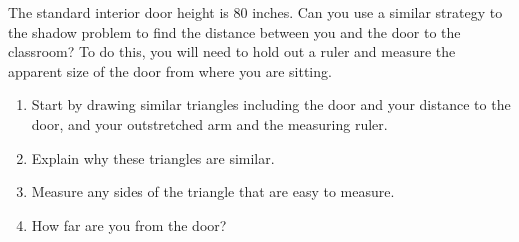\documentclass[nooutcomes,noauthor]{ximera}
\begin{document}
\begin{problem}
The standard interior door height is $80$ inches. Can you use a similar strategy to the shadow problem to find the distance between you and the door to the classroom? To do this, you will need to hold out a ruler and measure the apparent size of the door from where you are sitting.
\begin{enumerate}
	\item Start by drawing similar triangles including the door and your distance to the door, and your outstretched arm and the measuring ruler.
	\item Explain why these triangles are similar.
	\item Measure any sides of the triangle that are easy to measure.
	\item How far are you from the door?
\end{enumerate}
\end{problem}



\newpage
\end{document}
